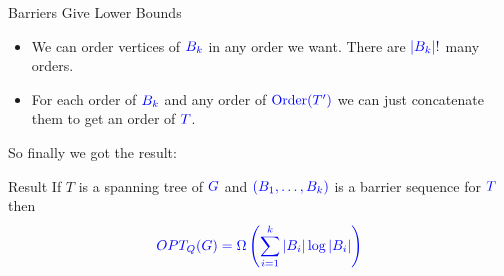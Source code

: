 \documentclass[10pt]{beamer}
\DeclareMathOperator{\order}{Order}
\begin{document}
\begin{frame}{Barriers Give Lower Bounds}

	\begin{itemize}
		\item We can order vertices of $\mathcolor{blue}{B_k}$ in any order we want. There are $\mathcolor{blue}{|B_k|!}$ many orders. \pause
		\item For each order of $\mathcolor{blue}{B_k}$ and any order of $\mathcolor{blue}{\order(T')}$ we can just concatenate them to get an order of $\mathcolor{blue}{T}$.\pause
	\end{itemize}
	\vfill

	So finally we got the result:
	\begin{alertblock}{Result}
		If $T$ is a spanning tree of $\mathcolor{blue}{G}$ and $\mathcolor{blue}{(B_1,\dots, B_k)}$ is a barrier sequence for $\mathcolor{blue}{T}$ then $$\mathcolor{blue}{OPT_Q(G)=\Omega\left(\sum\limits_{i=1}^k|B_i|\log|B_i|\right)}$$
	\end{alertblock}
\end{frame}
\end{document}
